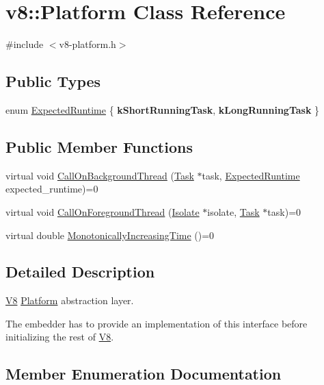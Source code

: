 \hypertarget{classv8_1_1Platform}{}\section{v8\+:\+:Platform Class Reference}
\label{classv8_1_1Platform}


{\ttfamily \#include $<$v8-\/platform.\+h$>$}

\subsection*{Public Types}
\begin{DoxyCompactItemize}
\item 
enum \hyperlink{classv8_1_1Platform_ace7f666b2b5995bb0e898e12fa660718}{Expected\+Runtime} \{ {\bfseries k\+Short\+Running\+Task}, 
{\bfseries k\+Long\+Running\+Task}
 \}
\end{DoxyCompactItemize}
\subsection*{Public Member Functions}
\begin{DoxyCompactItemize}
\item 
virtual void \hyperlink{classv8_1_1Platform_aa715e6839c1954b4e23b9d2df00bd3ea}{Call\+On\+Background\+Thread} (\hyperlink{classv8_1_1Task}{Task} $\ast$task, \hyperlink{classv8_1_1Platform_ace7f666b2b5995bb0e898e12fa660718}{Expected\+Runtime} expected\+\_\+runtime)=0
\item 
virtual void \hyperlink{classv8_1_1Platform_a8fa13959f919d1d3ff170bceea939915}{Call\+On\+Foreground\+Thread} (\hyperlink{classv8_1_1Isolate}{Isolate} $\ast$isolate, \hyperlink{classv8_1_1Task}{Task} $\ast$task)=0
\item 
virtual double \hyperlink{classv8_1_1Platform_a6d4d7c2dcf6b0c7113099b97fa7f57b7}{Monotonically\+Increasing\+Time} ()=0
\end{DoxyCompactItemize}


\subsection{Detailed Description}
\hyperlink{classv8_1_1V8}{V8} \hyperlink{classv8_1_1Platform}{Platform} abstraction layer.

The embedder has to provide an implementation of this interface before initializing the rest of \hyperlink{classv8_1_1V8}{V8}. 

\subsection{Member Enumeration Documentation}
\hypertarget{classv8_1_1Platform_ace7f666b2b5995bb0e898e12fa660718}{}
